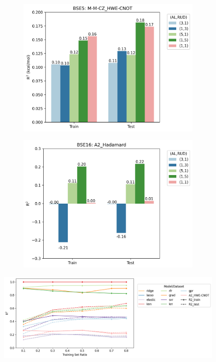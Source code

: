 \documentclass[journal=jacsat,manuscript=article]{achemso}
\begin{document}
\begin{figure}[H]
	\centering	
	\begin{subfigure}[b]{0.49\textwidth}
		\centering
		\includegraphics[width=\linewidth]{../images/BSE/fivequbit/BSE5_RUDAL}
		\caption{}
		\label{fig:bse5rudal}
	\end{subfigure}
	\hfill
	\begin{subfigure}[b]{0.49\textwidth}
		\centering
		\includegraphics[width=\linewidth]{../images/BSE/sixteenqubit/BSE16_RUDAL}
		\caption{}
		\label{fig:bse16rudal}
	\end{subfigure}
	\caption{}
	\label{fig:BSE_RUD_AL}	
\end{figure}


\begin{figure}[H]
	\centering
	\includegraphics[width=0.7\linewidth]{../images/BSE/fivequbit/BSE5_learning_curves}
	\caption{}
	\label{fig:bse5learningcurves}
\end{figure}
\end{document}
